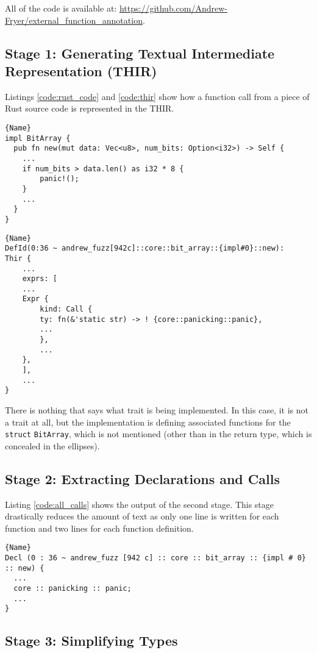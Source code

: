 \documentclass[11pt]{article}
\begin{document}
All of the code is available at: \url{https://github.com/Andrew-Fryer/external_function_annotation}.

\subsection{Stage 1: Generating Textual Intermediate Representation (THIR)}

Listings \ref{code:rust_code} and \ref{code:thir} show how a function call from a piece of Rust source code is represented in the THIR.

\begin{lstlisting}[caption=Rust Code, label=code:rust_code]{Name}
impl BitArray {
  pub fn new(mut data: Vec<u8>, num_bits: Option<i32>) -> Self {
    ...
    if num_bits > data.len() as i32 * 8 {
        panic!();
    }
    ...
  }
}
\end{lstlisting}

\begin{lstlisting}[caption=THIR-flat, label=code:thir]{Name}
DefId(0:36 ~ andrew_fuzz[942c]::core::bit_array::{impl#0}::new):
Thir {
    ...
    exprs: [
    ...
    Expr {
        kind: Call {
        ty: fn(&'static str) -> ! {core::panicking::panic},
        ...
        },
        ...
    },
    ],
    ...
}
\end{lstlisting}

There is nothing that says what trait is being implemented.
In this case, it is not a trait at all, but the implementation is defining associated functions for the \lstinline{struct} \lstinline{BitArray}, which is not mentioned (other than in the return type, which is concealed in the ellipses).

\subsection{Stage 2: Extracting Declarations and Calls}

Listing \ref{code:all_calls} shows the output of the second stage.
This stage drastically reduces the amount of text as only one line is written for each function and two lines for each function definition.

\begin{lstlisting}[caption=Extracted Calls, label=code:all_calls]{Name}
Decl (0 : 36 ~ andrew_fuzz [942 c] :: core :: bit_array :: {impl # 0} :: new) {
  ...
  core :: panicking :: panic;
  ...
}
\end{lstlisting}

\subsection{Stage 3: Simplifying Types}
\end{document}
